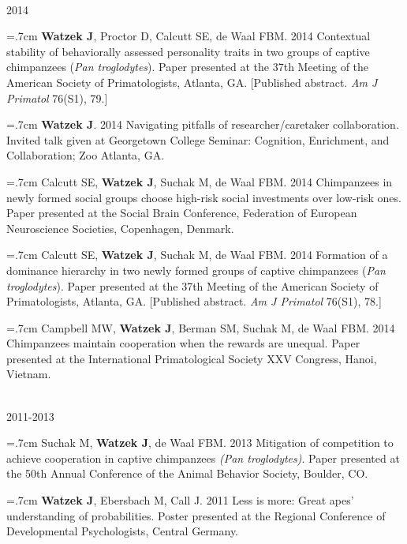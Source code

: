 \documentclass[]{friggeri-cv}
\begin{document}
{\large{} ~\\[-.15cm] 2014}

\hangindent=.7cm \textbf{Watzek J}, Proctor D, Calcutt SE, de Waal FBM. 2014 Contextual stability of behaviorally assessed personality traits in two groups of captive chimpanzees (\emph{Pan troglodytes}). Paper presented at the 37th Meeting of the American Society of Primatologists, Atlanta, GA. [Published abstract. \emph{Am J Primatol} 76(S1), 79.]

\hangindent=.7cm \textbf{Watzek J}. 2014 Navigating pitfalls of researcher/caretaker collaboration. Invited talk given at Georgetown College Seminar: Cognition, Enrichment, and Collaboration; Zoo Atlanta, GA.

\hangindent=.7cm Calcutt SE, \textbf{Watzek J}, Suchak M, de Waal FBM. 2014 Chimpanzees in newly formed social groups choose high-risk social investments over low-risk ones. Paper presented at the Social Brain Conference, Federation of European Neuroscience Societies, Copenhagen, Denmark.

\hangindent=.7cm Calcutt SE, \textbf{Watzek J}, Suchak M, de Waal FBM. 2014 Formation of a dominance hierarchy in two newly formed groups of captive chimpanzees (\emph{Pan troglodytes}). Paper presented at the 37th Meeting of the American Society of Primatologists, Atlanta, GA. [Published abstract. \emph{Am J Primatol} 76(S1), 78.]

\hangindent=.7cm Campbell MW, \textbf{Watzek J}, Berman SM, Suchak M, de Waal FBM. 2014 Chimpanzees maintain cooperation when the rewards are unequal. Paper presented at the International Primatological Society XXV Congress, Hanoi, Vietnam.


{\large{} ~\\[-.15cm] 2011-2013}

\hangindent=.7cm Suchak M, \textbf{Watzek J}, de Waal FBM. 2013 Mitigation of competition to achieve cooperation in captive chimpanzees \emph{(Pan troglodytes)}. Paper presented at the 50th Annual Conference of the Animal Behavior Society, Boulder, CO.

\hangindent=.7cm \textbf{Watzek J}, Ebersbach M, Call J. 2011 Less is more: Great apes' understanding of probabilities. Poster presented at the Regional Conference of Developmental Psychologists, Central Germany.\\[-.1cm]
\end{document}
